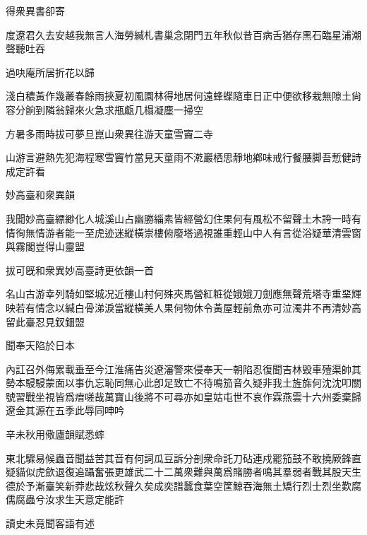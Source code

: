 \documentclass{zhvt-classic-Miya}
\begin{document}
\begin{fw}得衆異書卻寄\end{fw}

度遼君久去安越我無言人海勞緘札書巢念閉門五年秋似昔百病舌猶存黑石臨星浦潮聲聽吐吞

\begin{fw}過吷庵所居折花以歸\end{fw}

淺白穠黃作幾叢春餘雨挾夏初風園林得地居何遠蜂蝶隨車日正中便欲移栽無隙土尙容分餉到隣翁歸來火急求甁甗几榻凝塵一掃空

\begin{fw}方暑多雨時拔可夢旦崑山衆異往游天童雪竇二寺\end{fw}

山游言避熱先犯海程寒雪竇竹當見天童雨不漧巖栖思靜地鄕味戒行餐腰脚吾慙健詩成定許看

\begin{fw}妙高臺和衆異韻\end{fw}

我聞妙高臺縹緲化人城溪山占幽勝緇素皆經營幻住果何有風松不留聲土木誇一時有情徇無情游者能一至虎迹迷縱橫崇樓俯廢塔過視誰重輕山中人有言從浴疑華清雲窗與霧閣豈得山靈盟

\begin{fw}拔可旣和衆異妙高臺詩更依韻一首\end{fw}

名山古游幸列騎如堅城况近樓山村何殊夾馬營紅粧從娥娥刀劍應無聲荒塔寺重堊輝映若有情念以緘白骨涕淚當縱橫美人果何物休令黃屋輕前魚亦可泣濁井不再清妙高留此臺忍見釵鈿盟

\begin{fw}聞奉天陷於日本\end{fw}

內訌召外侮累載垂至今江淮痛告災遼瀋警來侵奉天一朝陷忍復聞吉林毁車殪渠帥其勢本駸駸蒙面以事仇忘恥同無心此卽足致亡不待鳴笳音久疑非我土旌旆何沈沈叩關號習戰坐視皆爲瘖嗟哉萬寶山後將不可尋亦如皇姑屯世不哀作霖燕雲十六州委棄歸遼金其源在五季此辱同呻吟

\begin{fw}辛未秋用儆廬韻賦悉蟀\end{fw}

東北驟易候蟲音聞益苦其音有何詞瓜豆訴分剖衆命託刀砧連戍罷笳鼓不敢撓厥鋒直疑貓似虎歛退復追躡奮張更雄武二十二萬衆難與萬爲賭勝者鳴其羣弱者戰其股天生德於予漸臺笑新莽悲哉炫秋聲久矣成奕譜蠶食葉空筐鯨吞海無土矯行烈士烈坐歎腐儒腐蟲兮汝求生天意定能許

\begin{fw}讀史未竟聞客語有述\end{fw}
\end{document}
